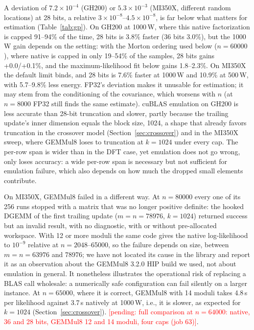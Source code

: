 \documentclass[conference]{IEEEtran}
\newcommand{\W}{\,W}
\newcommand{\ee}[2]{#1{\times}10^{#2}}  %
\newcommand{\pct}{\%}
\newcommand{\pending}[1]{\textcolor{red}{[pending: #1]}}
\begin{document}
A deviation of $\ee{7.2}{-4}$ (GH200) or $\ee{5.3}{-3}$ (MI350X, different random locations) at 28 bits, a relative
$\ee{3}{-8}$--$\ee{4.5}{-8}$, is far below what matters for estimation (Table~\ref{tab:gp}). On GH200 at 1000\W, where
this native factorization is capped 91--94\pct{} of the time, 28 bits is 3.8\pct{} faster (36 bits 3.0\pct), but the
1000\W{} gain depends on the setting: with the Morton ordering used below ($n=60000$), where native is capped in only
19--54\pct{} of the samples, 28 bits gains +0.0/+0.1\pct, and the maximum-likelihood fit below gains 1.8--2.3\pct. On
MI350X the default limit binds, and 28 bits is 7.6\pct{} faster at 1000\W{} and 10.9\pct{} at 500\W, with 5.7--9.8\pct{}
less energy. FP32's deviation makes it unusable for estimation; it may stem from the conditioning of the covariance, which
worsens with $n$ (at $n=8000$ FP32 still finds the same estimate). cuBLAS emulation on GH200 is less accurate than 28-bit
truncation and slower, partly because the trailing update's inner dimension equals the block size, 1024, a shape that
already favors truncation in the crossover model (Section~\ref{sec:crossover}) and in the MI350X sweep, where GEMMul8 loses
to truncation at $k=1024$ under every cap. The per-row span is wider than in the DFT case, yet emulation does not go
wrong, only loses accuracy: a wide per-row span is necessary but not sufficient for emulation failure, which also depends
on how much the dropped small elements contribute.

On MI350X, GEMMul8 failed in a different way. At $n=80000$ every one of its 256 runs stopped with a matrix that was no
longer positive definite: the hooked DGEMM of the first trailing update ($m=n=78976$, $k=1024$) returned success but an
invalid result, with no diagnostic, with or without pre-allocated workspace. With 12 or more moduli the same code gives
the native log-likelihood to $10^{-9}$ relative at $n=2048$--65000, so the failure depends on size, between
$m=n=63976$ and 78976; we have not located its cause in the library and report it as an observation about the GEMMul8
3.2.0 HIP build we used, not about emulation in general. It nonetheless illustrates the operational risk of replacing a
BLAS call wholesale: a numerically safe configuration can fail silently on a larger instance. At $n=65000$, where it is
correct, GEMMul8 with 14 moduli takes 4.8\,s per likelihood against 3.7\,s natively at 1000\W, i.e., it is slower, as
expected for $k=1024$ (Section~\ref{sec:crossover}). \pending{full comparison at $n=64000$: native, 36 and 28 bits,
GEMMul8 12 and 14 moduli, four caps (job 63)}.
\end{document}
